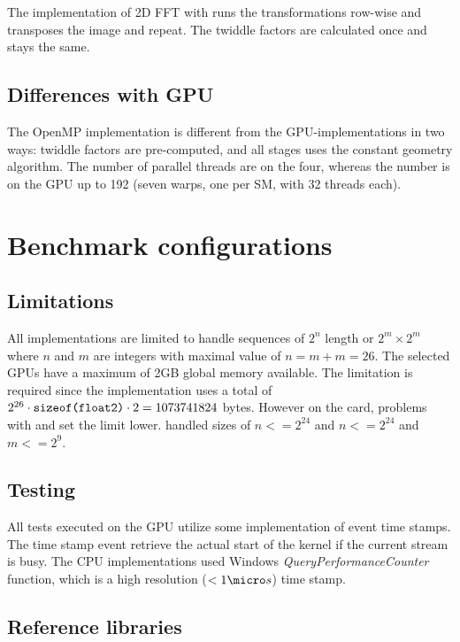 The implementation of \gls{2D} \gls{FFT} with {\OMP} runs the transformations row-wise and transposes the image and repeat. The twiddle factors are calculated once and stays the same.

\subsection{Differences with GPU}

The OpenMP implementation is different from the \gls{GPU}-implementations in two ways: twiddle factors are pre-computed, and all stages uses the constant geometry algorithm. The number of parallel threads are on the {\INTELCPU} four, whereas the number is on the \gls{GPU} up to 192 (seven warps, one per \gls{SM}, with 32 threads each).

\section{Benchmark configurations}

\subsection{Limitations}

All implementations are limited to handle sequences of $2^n$ length or $2^m \times 2^m$ where $n$ and $m$ are integers with maximal value of $n = m + m = 26$. The selected \gls{GPU}s have a maximum of 2GB global memory available. The limitation is required since the implementation uses a total of $2^{26} \cdot \texttt{sizeof(float2)} \cdot 2 = 1073741824$ bytes. However on the {\AMDCARD} card, problems with {\DX} and {\GL} set the limit lower. {\DX} handled sizes of $n <= 2^{24}$ and {\GL} $n <= 2^{24}$ and $m <= 2^{9}$.

\subsection{Testing}

All tests executed on the \gls{GPU} utilize some implementation of event time stamps. The time stamp event retrieve the actual start of the kernel if the current stream is busy. The \gls{CPU} implementations used Windows \emph{QueryPerformanceCounter} function, which is a high resolution ($<1{\micro}s$) time stamp.

\subsection{Reference libraries}

